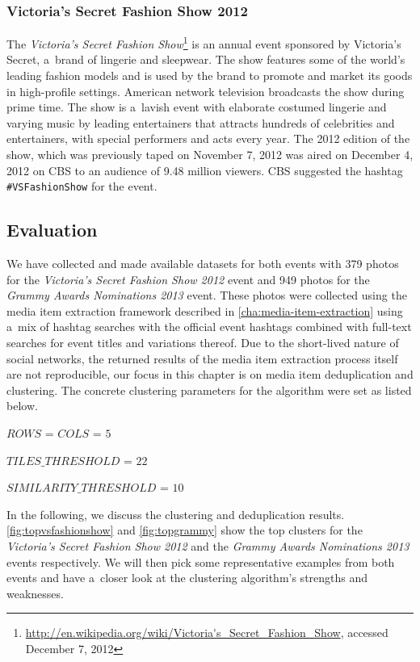 \subsubsection{Victoria's Secret Fashion Show 2012}

The \emph{Victoria's Secret Fashion
Show}\footnote{\url{http://en.wikipedia.org/wiki/Victoria's_Secret_Fashion_Show},
accessed December 7, 2012} is an annual event
sponsored by Victoria's Secret, a~brand of lingerie and sleepwear.
The show features some of the world's leading fashion models
and is used by the brand to promote and market its goods in high-profile settings.
American network television broadcasts the show during prime time.
The show is a~lavish event with elaborate costumed lingerie and
varying music by leading entertainers
that attracts hundreds of celebrities and entertainers,
with special performers and acts every year.
The 2012 edition of the show,
which was previously taped on November 7, 2012
was aired on December 4, 2012 on CBS
to an audience of 9.48 million viewers.
CBS suggested the hashtag \texttt{\#VSFashionShow} for the event.

\subsection{Evaluation}

We have collected and made available 
datasets for both events with
379 photos for the \emph{Victoria's Secret Fashion Show 2012} event 
and 949 photos for the \emph{Grammy Awards Nominations 2013} event.
These photos were collected using the media item extraction framework
described in \autoref{cha:media-item-extraction}
using a~mix of hashtag searches with the official event hashtags combined
with full-text searches for event titles and variations thereof.
Due to the short-lived nature of social networks,
the returned results of the media item extraction process itself
are not reproducible, our focus in this chapter
is on media item deduplication and clustering.
The concrete clustering parameters for the algorithm were set as listed below.

\begin{small_itemize}
  \item[] $ROWS$ = $COLS$ = $5$
  \item[] $TILES\_THRESHOLD$ = $22$
  \item[] $SIMILARITY\_THRESHOLD$ = $10$
\end{small_itemize}

In the following, we discuss the clustering and deduplication results.
\autoref{fig:topvsfashionshow} and \autoref{fig:topgrammy} show the top clusters
for the \emph{Victoria's Secret Fashion Show 2012} and the 
\emph{Grammy Awards Nominations 2013} events respectively.
We will then pick some representative examples from both events
and have a~closer look at the clustering algorithm's strengths and weaknesses.

